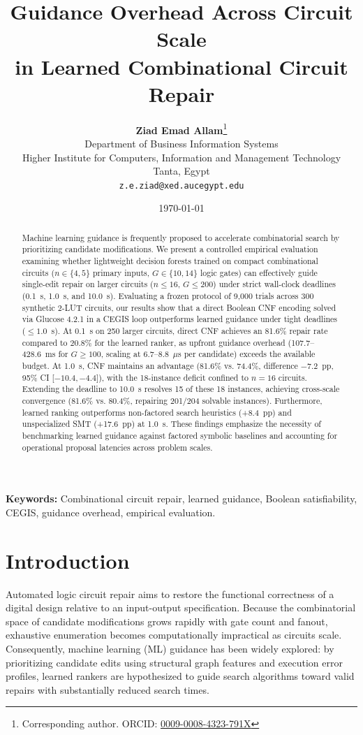 \documentclass[11pt,a4paper]{article}
\title{\LARGE\textbf{Guidance Overhead Across Circuit Scale\\in Learned Combinational Circuit Repair}}
\author{
  \textbf{Ziad Emad Allam}\thanks{Corresponding author. ORCID: \href{https://orcid.org/0009-0008-4323-791X}{0009-0008-4323-791X}} \\
  Department of Business Information Systems \\
  Higher Institute for Computers, Information and Management Technology \\
  Tanta, Egypt \\
  \texttt{z.e.ziad@xed.aucegypt.edu}
}
\date{\today}
\begin{document}
\maketitle
\linenumbers

\begin{abstract}
Machine learning guidance is frequently proposed to accelerate combinatorial search by prioritizing candidate modifications. We present a controlled empirical evaluation examining whether lightweight decision forests trained on compact combinational circuits ($n \in \{4, 5\}$ primary inputs, $G \in \{10, 14\}$ logic gates) can effectively guide single-edit repair on larger circuits ($n \le 16$, $G \le 200$) under strict wall-clock deadlines (0.1~s, 1.0~s, and 10.0~s). Evaluating a frozen protocol of 9,000 trials across 300 synthetic 2-LUT circuits, our results show that a direct Boolean CNF encoding solved via Glucose 4.2.1 in a CEGIS loop outperforms learned guidance under tight deadlines ($\le 1.0$~s). At 0.1~s on 250 larger circuits, direct CNF achieves an 81.6\% repair rate compared to 20.8\% for the learned ranker, as upfront guidance overhead (107.7--428.6~ms for $G \ge 100$, scaling at 6.7--8.8~$\mu$s per candidate) exceeds the available budget. At 1.0~s, CNF maintains an advantage (81.6\% vs. 74.4\%, difference $-7.2$~pp, 95\% CI [$-10.4, -4.4$]), with the 18-instance deficit confined to $n=16$ circuits. Extending the deadline to 10.0~s resolves 15 of these 18 instances, achieving cross-scale convergence (81.6\% vs. 80.4\%, repairing 201/204 solvable instances). Furthermore, learned ranking outperforms non-factored search heuristics (+8.4~pp) and unspecialized SMT (+17.6~pp) at 1.0~s. These findings emphasize the necessity of benchmarking learned guidance against factored symbolic baselines and accounting for operational proposal latencies across problem scales.
\end{abstract}

\vspace{0.5em}
\noindent\textbf{Keywords:} Combinational circuit repair, learned guidance, Boolean satisfiability, CEGIS, guidance overhead, empirical evaluation.

\section{Introduction}
Automated logic circuit repair aims to restore the functional correctness of a digital design relative to an input-output specification. Because the combinatorial space of candidate modifications grows rapidly with gate count and fanout, exhaustive enumeration becomes computationally impractical as circuits scale. Consequently, machine learning (ML) guidance has been widely explored: by prioritizing candidate edits using structural graph features and execution error profiles, learned rankers are hypothesized to guide search algorithms toward valid repairs with substantially reduced search times.
\end{document}
